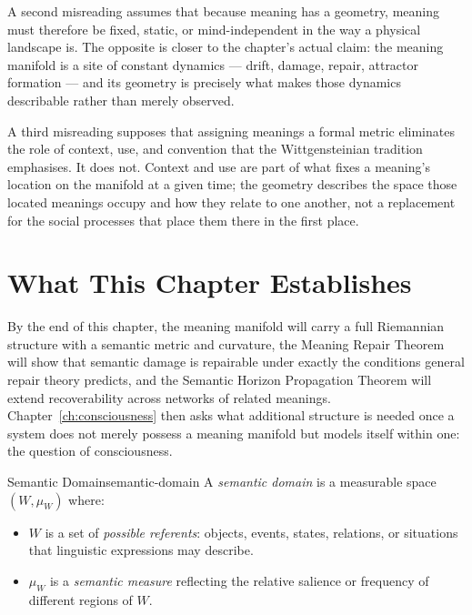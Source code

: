 \documentclass[12pt,twoside,openright]{book}
\begin{document}
A second misreading assumes that because meaning has a
geometry, meaning must therefore be fixed, static, or
mind-independent in the way a physical landscape is. The
opposite is closer to the chapter's actual claim: the meaning
manifold is a site of constant dynamics --- drift, damage,
repair, attractor formation --- and its geometry is precisely
what makes those dynamics describable rather than merely
observed.

A third misreading supposes that assigning meanings a formal
metric eliminates the role of context, use, and convention
that the Wittgensteinian tradition emphasises. It does not.
Context and use are part of what fixes a meaning's location
on the manifold at a given time; the geometry describes the
space those located meanings occupy and how they relate to
one another, not a replacement for the social processes that
place them there in the first place.

\section{What This Chapter Establishes}
\label{sec:ch20-preview}

By the end of this chapter, the meaning manifold will carry a
full Riemannian structure with a semantic metric and
curvature, the Meaning Repair Theorem will show that semantic
damage is repairable under exactly the conditions general
repair theory predicts, and the Semantic Horizon Propagation
Theorem will extend recoverability across networks of related
meanings. Chapter~\ref{ch:consciousness} then asks what
additional structure is needed once a system does not merely
possess a meaning manifold but models itself within one: the
question of consciousness.

\begin{definition}{Semantic Domain}{semantic-domain}
  A \emph{semantic domain} is a measurable space
  $(W, \mu_W)$ where:
  \begin{itemize}[nosep]
    \item $W$ is a set of \emph{possible referents}:
          objects, events, states, relations, or
          situations that linguistic expressions
          may describe.
    \item $\mu_W$ is a \emph{semantic measure}
          reflecting the relative salience or
          frequency of different regions of $W$.
  \end{itemize}
\end{definition}
\end{document}
